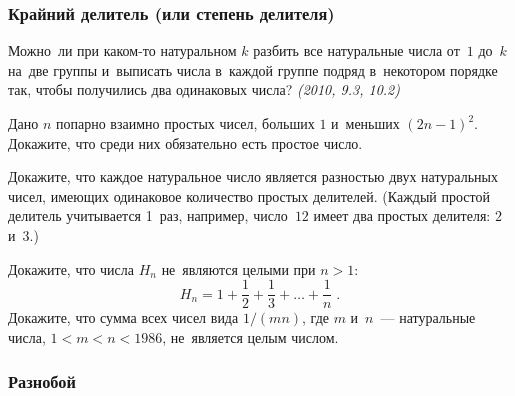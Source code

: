 \subsubsection*{Крайний делитель (или степень делителя)}

\begin{problems}

\item
Можно~ли при каком-то натуральном $k$ разбить все натуральные числа
от~$1$ до~$k$ на~две группы и~выписать числа в~каждой группе подряд в~некотором
порядке так, чтобы получились два одинаковых числа?
\emph{(2010, 9.3, 10.2)}

\item
Дано $n$ попарно взаимно простых чисел, больших $1$ и~меньших $(2 n - 1)^{2}$.
Докажите, что среди них обязательно есть простое число.

\item
Докажите, что каждое натуральное число является разностью двух натуральных
чисел, имеющих одинаковое количество простых делителей.
(Каждый простой делитель учитывается 1~раз, например, число~$12$ имеет два
простых делителя: $2$ и~$3$.)


\item
\subproblem
Докажите, что числа $H_{n}$ не~являются целыми при $n > 1$:
\[
    H_{n}
=
    1 + \frac{1}{2} + \frac{1}{3} + \ldots + \frac{1}{n}
\;
.
\]
\subproblem
Докажите, что сумма всех чисел вида $1 / (m n)$, где $m$ и~$n$~--- натуральные
числа, $1 < m < n < 1986$, не~является целым числом.

\end{problems}


\subsubsection*{Разнобой}

